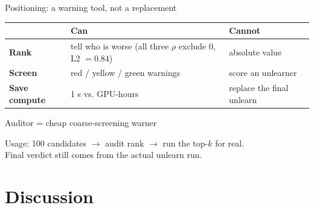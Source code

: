 \documentclass[aspectratio=169,10pt]{beamer}
\begin{document}
\begin{frame}{Positioning: a warning tool, not a replacement}
    \centering
    \small
    \begin{tabular}{@{}lll@{}}
        \toprule
         & \textbf{Can} & \textbf{Cannot} \\
        \midrule
        \textbf{Rank}    & tell who is worse (all three $\rho$ exclude 0, L2 $=0.84$) & absolute value \\
        \textbf{Screen}  & red / yellow / green warnings           & score an unlearner \\
        \textbf{Save compute} & 1 s vs. GPU-hours                  & replace the final unlearn \\
        \bottomrule
    \end{tabular}

    \vspace{1.0em}
    \begin{center}
        \Large
        \alert{Auditor = cheap coarse-screening warner}
    \end{center}

    \vspace{0.4em}
    \begin{center}
        \normalsize
        Usage: 100 candidates $\to$ audit rank $\to$ run the top-$k$ for real.\\
        Final verdict still comes from the actual unlearn run.
    \end{center}
\end{frame}

\section{Discussion}
\end{document}
